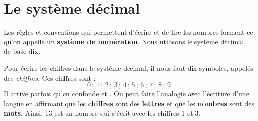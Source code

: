\section{Le système décimal}


Les règles et conventions qui permettent d'écrire et de lire les nombres forment ce qu'on appelle un \textbf{système de numération}. Nous utilisons le système décimal, de base dix.

\begin{aconnaitre}
Pour écrire les chiffres dans le système décimal, il nous faut dix symboles, appelés des \emph{chiffres}. Ces chiffres sont :
\[ 0\,;\,1\,;\,2\,;\,3\,;\,4\,;\,5\,;\,6\,;\,7\,;\,8\,;\,9  \]
Il arrive parfois qu'on confonde \textbf{} et \textbf{}. On peut faire l'analogie avec l'écriture d'une langue en affirmant que les \textbf{\textcolor{H1}{chiffres}} sont des \textbf{\textcolor{H1}{lettres}} et que les \textbf{\textcolor{H1}{nombres}} sont des \textbf{\textcolor{H1}{mots}}. Ainsi, 13 est un nombre qui s'écrit avec les chiffres 1 et 3.
\end{aconnaitre}

\newpage

